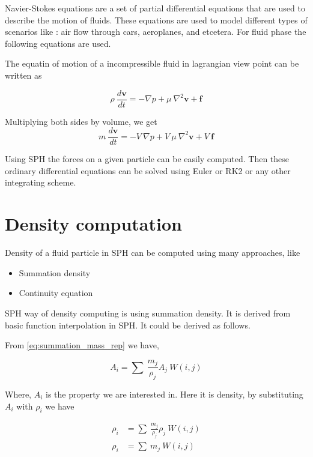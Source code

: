 Navier-Stokes equations are a set of partial differential equations
that are used to describe the motion of fluids. These equations are
used to model different types of scenarios like : air flow through
cars, aeroplanes, and etcetera.  For fluid phase the following
equations are used.

The equatin of motion of a incompressible fluid in lagrangian view
point can be written as

\begin{equation}
  \label{eq:momentum_eq}
  \rho\> \frac{d\textbf{v}}{dt} = -\nabla p + \mu\> \nabla^2\textbf{v} + \textbf{f}
\end{equation}

Multiplying both sides by volume, we get
\begin{equation}
  \label{eq:momentum_eq}
  m\>\frac{d\textbf{v}}{dt} = - V\> \nabla p + V\> \mu\> \nabla^2\textbf{v} + V\> \textbf{f}
\end{equation}

Using SPH the forces on a given particle can be easily computed. Then
these ordinary differential equations can be solved using Euler or RK2
or any other integrating scheme.

\section{Density computation}
\label{sec:density_comp}

Density of a fluid particle in SPH can be computed using many approaches, like

\begin{itemize}
\item Summation density
\item Continuity equation
\end{itemize}

SPH way of density computing is using summation density. It is derived from basic
function interpolation in SPH. It could be derived as follows.

From \eqref{eq:summation_mass_rep} we have,

\begin{equation*}
  \label{eq:summation_mass_rep}
  A_i = \sum\> \frac{m_j}{\rho_j} A_j\> W(i,j)
\end{equation*}

Where, $A_i$ is the property we are interested in. Here it is density,
by substituting $A_i$ with $\rho_i$ we have

\begin{align}
  \label{eq:summation_mass_rep}
    \rho_i &= \sum\> \frac{m_j}{\rho_j} \rho_j\> W(i,j) \nonumber \\
    \rho_i &= \sum\> m_j \> W(i,j)
\end{align}



